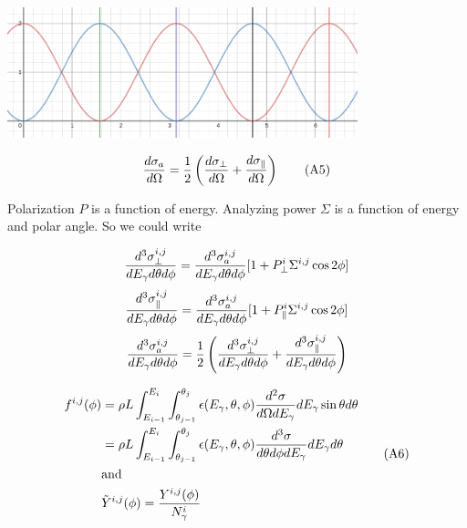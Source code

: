 \documentclass{article}
\begin{document}
\includegraphics[width=4in]{assymetry.png}

\begin{equation}
{d\sigma_a \over d\Omega} = {1 \over 2} \left( {d\sigma_\perp \over d\Omega} + {d\sigma_\parallel \over d\Omega} \right) \tag{A5} \\
\end{equation}

Polarization $P$ is a function of energy. Analyzing power $\Sigma$ is a function of energy and polar angle. So we could write

\begin{equation}
{d^3\sigma^{i,j}_\perp \over dE_\gamma d\theta d\phi} = {d^3\sigma^{i,j}_a \over dE_\gamma d\theta d\phi}[1+P^i_\perp\Sigma^{i,j}\cos 2\phi] \\
\end{equation}
\begin{equation}
{d^3\sigma^{i,j}_\parallel \over dE_\gamma d\theta d\phi} = {d^3\sigma^{i,j}_a \over dE_\gamma d\theta d\phi}[1+P^i_\parallel\Sigma^{i,j}\cos 2\phi] \\
\end{equation}
\begin{equation}
  {d^3\sigma^{i,j}_a \over dE_\gamma d\theta d\phi}
  = {1 \over 2} \left( {d^3\sigma^{i,j}_\perp \over dE_\gamma d\theta d\phi}
  + {d^3\sigma^{i,j}_\parallel \over dE_\gamma d\theta d\phi} \right)
\end{equation}

\begin{equation}
  \begin{split}
f^{i,j}(\phi) & = \rho L\int^{E_i}_{E_{i-1}}\int_{\theta_{j-1}}^{\theta_j} \epsilon(E_\gamma,\theta,\phi) {d^2\sigma \over d\Omega dE_\gamma} dE_\gamma \sin\theta d\theta \\
& = \rho L\int^{E_i}_{E_{i-1}}\int_{\theta_{j-1}}^{\theta_j} \epsilon(E_\gamma,\theta,\phi) {d^3\sigma \over d\theta d\phi dE_\gamma} dE_\gamma d\theta \\
& {\rm and} \\
& \tilde Y^{i,j}(\phi) = {Y^{i,j}(\phi) \over N^i_\gamma}
\end{split} \tag{A6}
\end{equation}
\end{document}
